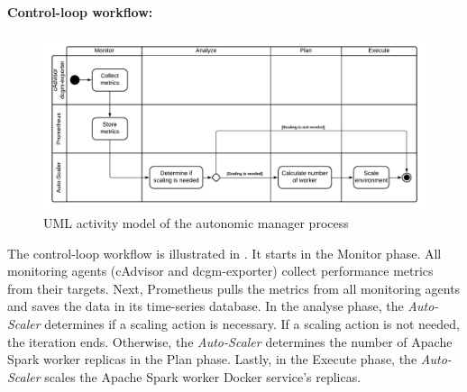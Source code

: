 \paragraph{Control-loop workflow:}
\begin{figure}[h]
\centering
\includegraphics[scale=0.50]{images/05_conceptual_design/autonomic_manager/autonomic_manager_workflow}
\caption{UML activity model of the autonomic manager process}
\label{fig:05_am_monitoring_loop_workflow}
\end{figure}
The control-loop workflow is illustrated in .
It starts in the Monitor phase. All monitoring agents (cAdvisor and dcgm-exporter) collect performance metrics from their targets. Next, Prometheus pulls the metrics from all monitoring agents and saves the data in its time-series database.
In the analyse phase, the \textit{Auto-Scaler} determines if a scaling action is necessary. If a scaling action is not needed, the iteration ends.
Otherwise, the \textit{Auto-Scaler} determines the number of Apache Spark worker replicas in the Plan phase.
Lastly, in the Execute phase, the \textit{Auto-Scaler} scales the Apache Spark worker Docker service's replicas.


